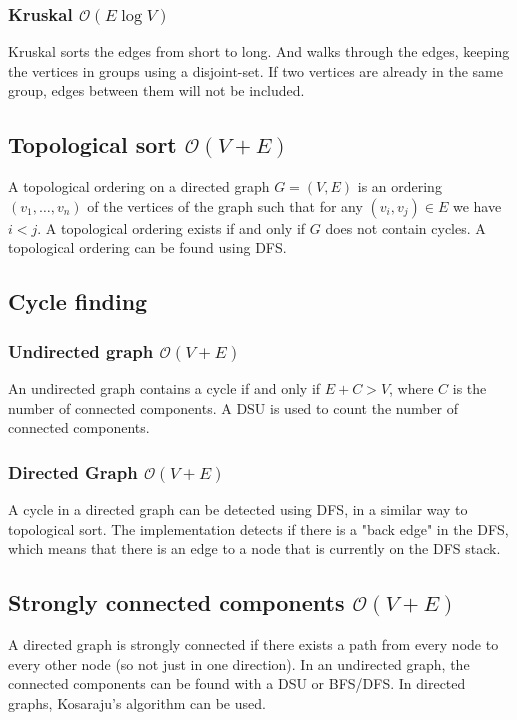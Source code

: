 \subsubsection{Kruskal $\mathcal O(E\log V)$}
Kruskal sorts the edges from short to long. And walks through the edges, keeping the vertices in groups using a disjoint-set. If two vertices are already in the same group, edges between them will not be included.



\subsection{Topological sort $\mathcal O(V + E)$}

A topological ordering on a directed graph $G = (V, E)$ is an ordering $(v_1, \dots, v_n)$ of the vertices of the graph such that for any $(v_i, v_j) \in E$ we have $i < j$. A topological ordering exists if and only if $G$ does not contain cycles. A topological ordering can be found using DFS.



\subsection{Cycle finding}

\subsubsection{Undirected graph $\mathcal O(V + E)$}
An undirected graph contains a cycle if and only if $E + C > V$, where $C$ is the number of connected components. A DSU is used to count the number of connected components.

\subsubsection{Directed Graph $\mathcal O(V + E)$}
A cycle in a directed graph can be detected using DFS, in a similar way to topological sort. The implementation detects if there is a "back edge" in the DFS, which means that there is an edge to a node that is currently on the DFS stack.



\subsection{Strongly connected components $\mathcal O(V + E)$}
A directed graph is strongly connected if there exists a path from every node to every other node (so not just in one direction). In an undirected graph, the connected components can be found with a DSU or BFS/DFS. In directed graphs, Kosaraju's algorithm can be used.


